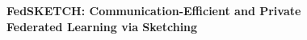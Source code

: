 \documentclass[10pt]{article}
\begin{document}
\begin{center}

{\bf{\LARGE{FedSKETCH: Communication-Efficient and Private \\\vspace*{.2in} Federated Learning via Sketching}}}
\vspace*{.2in}

{{
}}


\vspace*{.2in}



{\large{
\begin{tabular}{c}
\end{tabular}
}}

\begin{tabular}{c}
\end{tabular}

\vspace*{.2in}


\date{\today}

\end{center}
\end{document}
